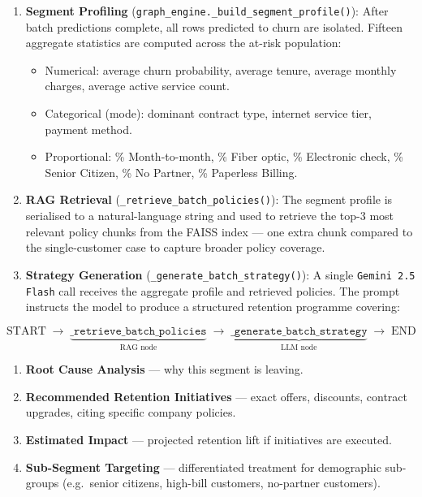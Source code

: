 \documentclass[12pt,a4paper]{article}
\begin{document}
\begin{enumerate}[leftmargin=2em]
    \item \textbf{Segment Profiling} (\texttt{graph\_engine.\_build\_segment\_profile()}): After batch predictions complete, all rows predicted to churn are isolated. Fifteen aggregate statistics are computed across the at-risk population:
    \begin{itemize}[leftmargin=2em]
        \item Numerical: average churn probability, average tenure, average monthly charges, average active service count.
        \item Categorical (mode): dominant contract type, internet service tier, payment method.
        \item Proportional: \% Month-to-month, \% Fiber optic, \% Electronic check, \% Senior Citizen, \% No Partner, \% Paperless Billing.
    \end{itemize}
    \item \textbf{RAG Retrieval} (\texttt{\_retrieve\_batch\_policies()}): The segment profile is serialised to a natural-language string and used to retrieve the top-3 most relevant policy chunks from the FAISS index --- one extra chunk compared to the single-customer case to capture broader policy coverage.
    \item \textbf{Strategy Generation} (\texttt{\_generate\_batch\_strategy()}): A single \texttt{Gemini 2.5 Flash} call receives the aggregate profile and retrieved policies. The prompt instructs the model to produce a structured retention programme covering:
\end{enumerate}

\[
\text{START} \;\rightarrow\; \underbrace{\texttt{\_retrieve\_batch\_policies}}_{\text{RAG node}} \;\rightarrow\; \underbrace{\texttt{\_generate\_batch\_strategy}}_{\text{LLM node}} \;\rightarrow\; \text{END}
\]

\begin{tcolorbox}[colback=lightgray, colframe=primary, title={\textbf{Batch Strategy Output Structure}}]
\begin{enumerate}[leftmargin=1.5em, itemsep=2pt]
    \item \textbf{Root Cause Analysis} --- why this segment is leaving.
    \item \textbf{Recommended Retention Initiatives} --- exact offers, discounts, contract upgrades, citing specific company policies.
    \item \textbf{Estimated Impact} --- projected retention lift if initiatives are executed.
    \item \textbf{Sub-Segment Targeting} --- differentiated treatment for demographic sub-groups (e.g.\ senior citizens, high-bill customers, no-partner customers).
\end{enumerate}
\end{tcolorbox}
\end{document}
